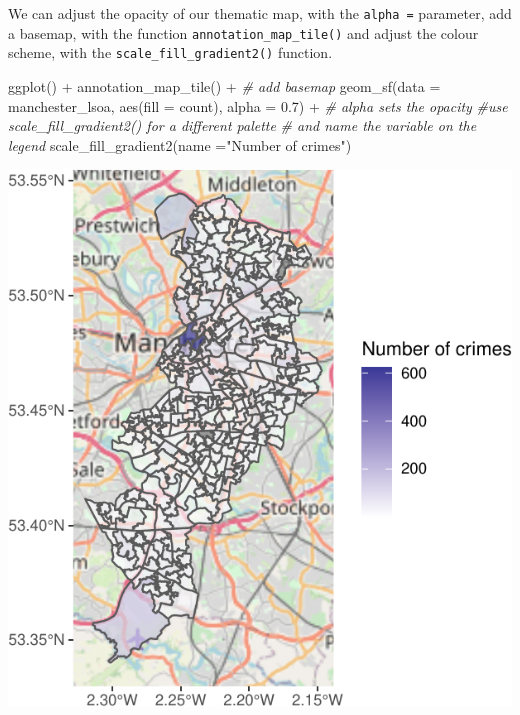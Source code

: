 \documentclass[
]{book}
\makeatletter
\newenvironment{Shaded}{\begin{snugshade}}{\end{snugshade}}
\newcommand{\AttributeTok}[1]{\textcolor[rgb]{0.61,0.61,0.61}{#1}}
\newcommand{\CommentTok}[1]{\textcolor[rgb]{0.37,0.37,0.37}{\textit{#1}}}
\newcommand{\FloatTok}[1]{\textcolor[rgb]{0.06,0.06,0.06}{#1}}
\newcommand{\FunctionTok}[1]{\textcolor[rgb]{0,0,0}{#1}}
\newcommand{\NormalTok}[1]{#1}
\newcommand{\SpecialCharTok}[1]{\textcolor[rgb]{0,0,0}{#1}}
\newcommand{\StringTok}[1]{\textcolor[rgb]{0.5,0.5,0.5}{#1}}
\newenvironment{kframe}{%
\medskip{}
\setlength{\fboxsep}{.8em}
 \def\at@end@of@kframe{}%
 \ifinner\ifhmode%
  \def\at@end@of@kframe{\end{minipage}}%
  \begin{minipage}{\columnwidth}%
 \fi\fi%
 \def\FrameCommand##1{\hskip\@totalleftmargin \hskip-\fboxsep
 \colorbox{shadecolor}{##1}\hskip-\fboxsep
     \hskip-\linewidth \hskip-\@totalleftmargin \hskip\columnwidth}%
 \MakeFramed {\advance\hsize-\width
   \@totalleftmargin\z@ \linewidth\hsize
   \@setminipage}}%
 {\par\unskip\endMakeFramed%
 \at@end@of@kframe}
\renewenvironment{Shaded}{\begin{kframe}}{\end{kframe}}
\makeatother
\begin{document}
We can adjust the opacity of our thematic map, with the \texttt{alpha\ =} parameter, add a basemap, with the function \texttt{annotation\_map\_tile()} and adjust the colour scheme, with the \texttt{scale\_fill\_gradient2()} function.

\begin{Shaded}
\begin{Highlighting}[]
\FunctionTok{ggplot}\NormalTok{() }\SpecialCharTok{+} 
  \FunctionTok{annotation\_map\_tile}\NormalTok{() }\SpecialCharTok{+}  \CommentTok{\# add basemap}
\FunctionTok{geom\_sf}\NormalTok{(}\AttributeTok{data =}\NormalTok{ manchester\_lsoa, }
        \FunctionTok{aes}\NormalTok{(}\AttributeTok{fill =}\NormalTok{ count), }
        \AttributeTok{alpha =} \FloatTok{0.7}\NormalTok{) }\SpecialCharTok{+} \CommentTok{\# alpha sets the opacity}
  \CommentTok{\#use scale\_fill\_gradient2() for a different palette }
  \CommentTok{\# and name the variable on the legend}
  \FunctionTok{scale\_fill\_gradient2}\NormalTok{(}\AttributeTok{name =}\StringTok{"Number of crimes"}\NormalTok{) }
\end{Highlighting}
\end{Shaded}

\includegraphics{crime_mapping_files/figure-latex/unnamed-chunk-31-1.pdf}
\end{document}

